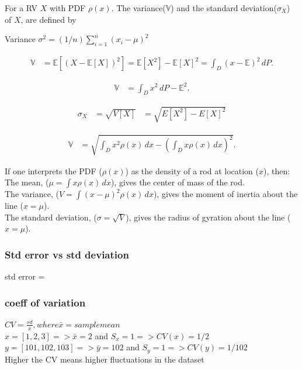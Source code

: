 \documentclass{beamer}
\begin{document}

\begin{frame}

For a RV $X$ with PDF $\rho(x)$. The variance($\mathbb{V}$) and the standard deviation($\sigma_X$) of $X$, are defined by

Variance   $\sigma^2 = (1/n)\sum_{i=1}^{n}(x_i - \mu)^2$

\begin{align*} \mathbb{V} &= \mathbb{E}\left[ \left( X-\mathbb{E}[X] \right)^2 \right]
=\mathbb{E}[X^2] - \mathbb{E}[X]^2
= \int_D (x-\mathbb{E})^2 \, dP. \end{align*}

\begin{align*} \mathbb{V} &= \int_D x^2 \, dP - \mathbb{E}^2. \end{align*} 

\begin{align*}\sigma_X&=\sqrt{V[X]}
&=\sqrt{E[X^2]-E[X]^2}
\end{align*}

\begin{align*} \mathbb{V} &=\sqrt{\int_D x^2\rho(x)\,dx - \left(\int_D x\rho(x) \,dx\right)^2}. \end{align*}


\end{frame}


\begin{frame}
If one interprets the PDF ($\rho(x)$) as the density of a rod at location ($x$), then:\\

The mean, ($\mu = \int x\rho(x)\,dx$), gives the center of mass of the rod.\\
The variance, ($V = \int (x-\mu)^2\rho(x)\,dx$), gives the moment of inertia about the line ($x = \mu$).\\
The standard deviation, ($\sigma = \sqrt{V}$), gives the radius of gyration about the line ($x = \mu$).

\end{frame}

\begin{frame}\frametitle{Std error vs std deviation}
std error = 
\end{frame}


\begin{frame}\frametitle{coeff of variation}
$CV = \frac{sd}{\bar{x}}, where  \bar{x}=sample mean$ \\
$x = [1,2,3] => \bar{x}=2$ and $S_x=1 => CV(x)=1/2 $\\
$y = [101,102,103] => \bar{y}=102$ and $S_y=1 => CV(y)=1/102 $\\
Higher the CV means higher fluctuations in the dataset\\

\end{frame}
\end{document}
